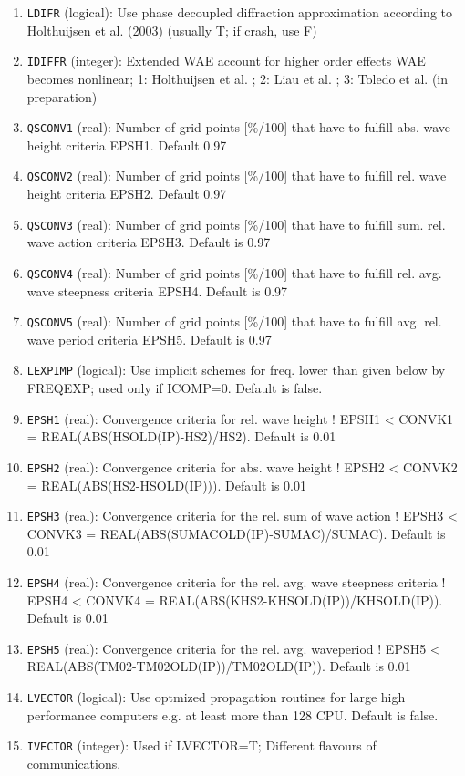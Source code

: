 \documentclass[12pt]{amsart}
\begin{document}
\begin{enumerate}
\item {\tt LDIFR} (logical): Use phase decoupled diffraction approximation according to Holthuijsen et al. (2003) (usually T; if crash, use F)
\item {\tt IDIFFR} (integer): Extended WAE account for higher order effects WAE becomes nonlinear; 1: Holthuijsen et al. ; 2: Liau et al. ; 3: Toledo et al. (in preparation)
\item {\tt QSCONV1} (real): Number of grid points [\%/100] that have to fulfill abs. wave height criteria EPSH1. Default 0.97
\item {\tt QSCONV2} (real): Number of grid points [\%/100] that have to fulfill rel. wave height criteria EPSH2. Default 0.97
\item {\tt QSCONV3} (real): Number of grid points [\%/100] that have to fulfill sum. rel. wave action criteria EPSH3. Default is 0.97
\item {\tt QSCONV4} (real): Number of grid points [\%/100] that have to fulfill rel. avg. wave steepness criteria EPSH4. Default is 0.97
\item {\tt QSCONV5} (real): Number of grid points [\%/100] that have to fulfill avg. rel. wave period criteria EPSH5. Default is 0.97
\item {\tt LEXPIMP} (logical): Use implicit schemes for freq. lower than given below by FREQEXP; used only if ICOMP=0. Default is false.
\item {\tt EPSH1} (real): Convergence criteria for rel. wave height ! EPSH1 < CONVK1 = REAL(ABS(HSOLD(IP)-HS2)/HS2). Default is 0.01
\item {\tt EPSH2} (real): Convergence criteria for abs. wave height ! EPSH2 < CONVK2 = REAL(ABS(HS2-HSOLD(IP))). Default is 0.01
\item {\tt EPSH3} (real): Convergence criteria for the rel. sum of wave action ! EPSH3 < CONVK3 = REAL(ABS(SUMACOLD(IP)-SUMAC)/SUMAC). Default is 0.01
\item {\tt EPSH4} (real): Convergence criteria for the rel. avg. wave steepness criteria ! EPSH4 < CONVK4 = REAL(ABS(KHS2-KHSOLD(IP))/KHSOLD(IP)). Default is 0.01
\item {\tt EPSH5} (real): Convergence criteria for the rel. avg. waveperiod ! EPSH5 < REAL(ABS(TM02-TM02OLD(IP))/TM02OLD(IP)). Default is 0.01
\item {\tt LVECTOR} (logical): Use optmized propagation routines for large high performance computers e.g. at least more than 128 CPU. Default is false.
\item {\tt IVECTOR} (integer): Used if LVECTOR=T; Different flavours of communications.

\end{enumerate}
\end{document}
